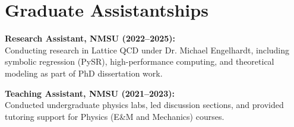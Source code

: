 \documentclass[11pt]{article}
\begin{document}
\section*{Graduate Assistantships}

\vspace{-0.3em}
\textbf{Research Assistant, NMSU (2022–2025):} \\
Conducting research in Lattice QCD under Dr. Michael Engelhardt, including symbolic regression (PySR), high-performance computing, and theoretical modeling as part of PhD dissertation work.

\vspace{-0.3em}
\textbf{Teaching Assistant, NMSU (2021–2023):} \\
Conducted undergraduate physics labs, led discussion sections, and provided tutoring support for Physics (E\&M and Mechanics) courses.
\end{document}

